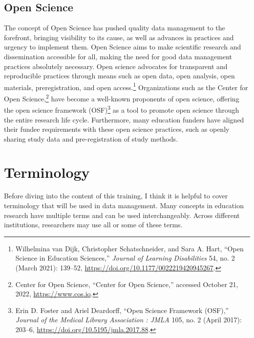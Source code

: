 \documentclass[
]{book}
\begin{document}
\hypertarget{open-science}{%
\subsection{Open Science}\label{open-science}}

The concept of Open Science has pushed quality data management to the forefront, bringing visibility to its cause, as well as advances in practices and urgency to implement them. Open Science aims to make scientific research and dissemination accessible for all, making the need for good data management practices absolutely necessary. Open science advocates for transparent and reproducible practices through means such as open data, open analysis, open materials, preregistration, and open access.\footnote{Wilhelmina van Dijk, Christopher Schatschneider, and Sara A. Hart, {``Open Science in Education Sciences,''} \emph{Journal of Learning Disabilities} 54, no. 2 (March 2021): 139--52, \url{https://doi.org/10.1177/0022219420945267}.} Organizations such as the Center for Open Science,\footnote{Center for Open Science, {``Center for Open Science,''} accessed October 21, 2022, \url{https://www.cos.io}.} have become a well-known proponents of open science, offering the open science framework (OSF)\footnote{Erin D. Foster and Ariel Deardorff, {``Open Science Framework ({OSF}),''} \emph{Journal of the Medical Library Association : {JMLA}} 105, no. 2 (April 2017): 203--6, \url{https://doi.org/10.5195/jmla.2017.88}.} as a tool to promote open science through the entire research life cycle. Furthermore, many education funders have aligned their fundee requirements with these open science practices, such as openly sharing study data and pre-registration of study methods.

\hypertarget{terminology}{%
\section{Terminology}\label{terminology}}

Before diving into the content of this training, I think it is helpful to cover terminology that will be used in data management. Many concepts in education research have multiple terms and can be used interchangeably. Across different institutions, researchers may use all or some of these terms.
\end{document}
